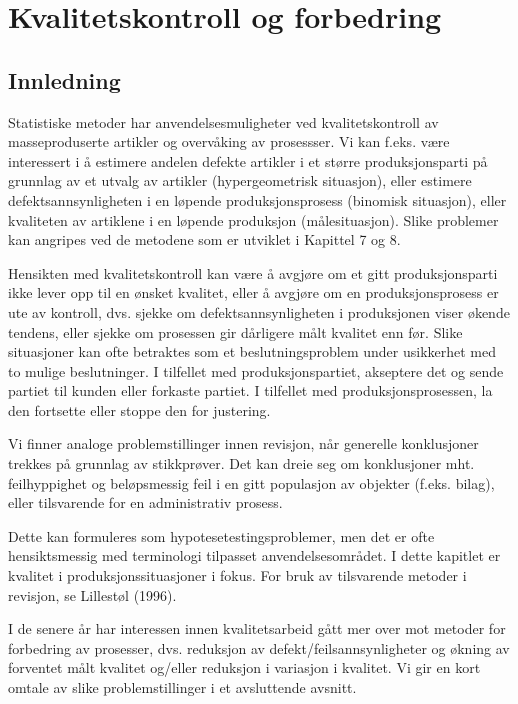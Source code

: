 \chapter{Kvalitetskontroll og forbedring}
\label{kap:kvalitetskontroll} %

\section{Innledning}
Statistiske metoder har anvendelsesmuligheter ved  kvalitetskontroll av
mas\-se\-produserte artikler og overvåking av prosessser.
Vi kan f.eks. være inte\-ressert i å
estimere andelen defekte artikler i et større produksjonsparti på
grunnlag av et utvalg av artikler (hypergeometrisk situasjon), eller estimere
defektsannsynligheten i en løpende produksjonsprosess (binomisk situasjon),
eller kvaliteten av artiklene i en løpende produksjon 
(måle\-situa\-sjon). Slike problemer kan angripes ved de metodene som er
utviklet i Kapittel 7 og 8.

Hensikten med  kvalitetskontroll kan være å avgjøre om et
gitt produksjonsparti ikke lever opp til en ønsket kvalitet,
eller å avgjøre om en produksjonsprosess er ute av kontroll,
dvs. sjekke om defektsannsynligheten i produksjonen viser økende
tendens, eller sjekke om prosessen gir dårligere målt
kvalitet enn før.  Slike situasjoner kan ofte betraktes som et 
beslutningsproblem under usikkerhet med to mulige beslutninger.  I tilfellet
med produksjonspartiet, akseptere det og sende partiet til kunden eller
forkaste partiet. I tilfellet med produksjonsprosessen, la den fortsette eller
stoppe den for justering.  

Vi finner analoge problemstillinger innen revisjon, når generelle
konklusjoner trekkes på grunnlag av stikkprøver. Det kan dreie seg
om konklusjoner mht. feilhyppighet og beløpsmessig feil i en gitt
populasjon av objekter (f.eks. bilag), eller tilsvarende for en administrativ
 prosess.

Dette kan formuleres som hypotesetestingsproblemer, men det er ofte
 hensiktsmessig med terminologi tilpasset anvendelsesområdet.
I dette kapitlet er kvalitet  i produksjonssituasjoner i fokus.
For bruk av tilsvarende metoder i revisjon, se Lillestøl (1996).

I de senere år har interessen innen kvalitetsarbeid gått mer over mot
metoder for forbedring av prosesser, dvs. reduksjon av
defekt/feil\-sann\-syn\-lig\-heter  og økning av forventet målt kvalitet
og/eller reduksjon i variasjon i kvalitet. Vi gir en kort omtale av slike 
problemstillinger i et avsluttende avsnitt.

